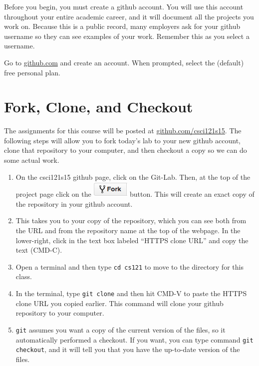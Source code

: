 \documentclass[11pt]{article}
\begin{document}
Before you begin, you must create a github account.  You will use this account throughout your entire academic career, and it will document all the projects you work on.  Because this is a public record, many employers ask for your github username so they can see examples of your work.  Remember this as you select a username.

Go to \url{github.com} and create an account.  When prompted, select the (default) free personal plan.

\section*{Fork, Clone, and Checkout}

The assignments for this course will be posted at \url{github.com/csci121s15}.  The following steps will allow you to fork today's lab to your new github account, clone that repository to your computer, and then checkout a copy so we can do some actual work.

\begin{enumerate}
\item On the csci121s15 github page, click on the Git-Lab.  Then, at the top of the project page click on the \includegraphics[scale=.5]{fork} button.  This will create an exact copy of the repository in your github account.

\item This takes you to your copy of the repository, which you can see both from the URL and from the repository name at the top of the webpage.  In the lower-right, click in the text box labeled ``HTTPS clone URL'' and copy the text (CMD-C).

\item Open a terminal and then type {\tt cd cs121} to move to the directory for this class.

\item In the terminal, type {\tt git clone} and then hit CMD-V to paste the HTTPS clone URL you copied earlier.  This command will clone your github repository to your computer.

\item {\tt git} assumes you want a copy of the current version of the files, so it automatically performed a checkout.  If you want, you can type command {\tt git checkout}, and it will tell you that you have the up-to-date version of the files.
\end{enumerate}
\end{document}
